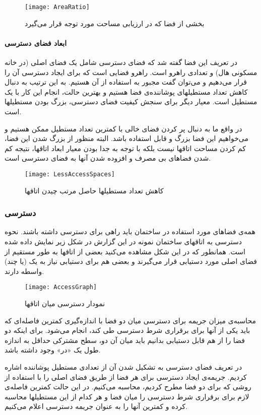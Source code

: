 \documentclass{report}
\begin{document}
\begin{figure} \centerline{\texttt{[image: AreaRatio]}} \caption{\label{fAreaRatio}
بخشی از فضا که در ارزیابی مساحت مورد توجه قرار می‌گیرد
 } \end{figure}

\paragraph{ابعاد فضای دسترسی}
در تعریف این فضا گفته شد که فضای دسترسی شامل یک فضای اصلی (در خانه مسکونی هال) و تعدادی راهرو است. راهرو فضایی است که برای ایجاد دسترسی آن را قرار می‌دهیم و می‌توان گفت مجبور به استفاده از آن هستیم. به این ترتیب به دنبال کاهش تعداد مستطیلهای پوشاننده‌ی فضا هستیم و بهترین حالت، انجام این کار با یک مستطیل است. معیار دیگر برای سنجش کیفیت فضای دسترسی، بزرگ بودن مستطیلها است.

در واقع ما به دنبال پر کردن فضای خالی با کمترین تعداد مستطیل ممکن هستیم و می‌خواهیم این فضا بزرگ و قابل استفاده باشد. البته منظور از بزرگ شدن این فضا، کم کردن مساحت اتاقها نیست بلکه با توجه به جدا بودن معیار ابعاد اتاقها، نتیجه کم شدن فضاهای بی مصرف و افزوده شدن آنها به فضای دسترسی است.

\begin{figure} \centerline{\texttt{[image: LessAccessSpaces]}} \caption{\label{fLessAccessSpaces}
کاهش تعداد مستطیلها حاصل مرتب چیدن اتاقها
 } \end{figure}

\subsubsection{دسترسی}
همه‌ی فضاهای مورد استفاده در ساختمان باید راهی برای دسترسی داشته باشند. نحوه دسترسی به اتاقهای ساختمان نمونه در این گزارش در شکل زیر نمایش داده شده است. همانطور که در این شکل مشاهده می‌کنید بعضی از اتاقها به طور مستقیم از فضای اصلی مورد دستیابی قرار می‌گیرند و بعضی هم برای دستیابی نیاز به یک (یا چند) واسطه دارند.

\begin{figure} \centerline{\texttt{[image: AccessGraph]}} \caption{\label{fAccessGraph}
نمودار دسترسی میان اتاقها
 } \end{figure}

محاسبه‌ی میزان جریمه برای دسترسی میان دو فضا با اندازه‌گیری کمترین فاصله‌ای که باید یکی از آنها برای برقراری شرط دسترسی طی کند، انجام می‌شود. برای اینکه دو فضا را از هم قابل دستیابی بدانیم باید میان آن دو، سطح مشترکی حداقل به اندازه طول یک «در» وجود داشته باشد.

در تعریف فضای دسترسی به تشکیل شدن آن از تعدادی مستطیل پوشاننده اشاره کردیم. جریمه‌ی ایجاد دسترسی برای هر فضا از طریق فضای اصلی را با استفاده از روشی که برای دو فضا مطرح کردیم، محاسبه می‌کنیم. در این حالت کمترین فاصله‌ی لازم برای برقراری شرط دسترسی را میان فضا و هر کدام از این مستطیلها محاسبه کرده و کمترین آنها را به عنوان جریمه دسترسی اعلام می‌کنیم.
\end{document}
